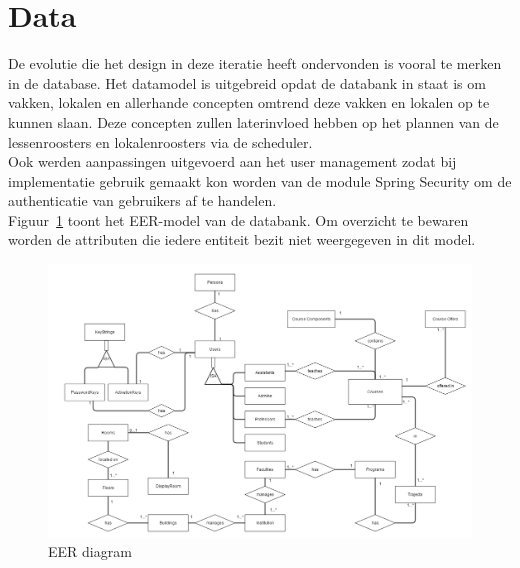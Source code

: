 \section{Data}
\label{sec:data}
De evolutie die het design in deze iteratie heeft ondervonden is vooral te merken in de database.
Het datamodel is uitgebreid opdat de databank in staat is om vakken, lokalen en allerhande concepten omtrend deze vakken en lokalen op te kunnen slaan. Deze concepten zullen laterinvloed hebben op het plannen van de lessenroosters en lokalenroosters via de scheduler.\\

Ook werden aanpassingen uitgevoerd aan het user management zodat bij implementatie gebruik gemaakt kon worden van de module Spring Security\cite{spring-security} om de authenticatie van gebruikers af te handelen.\\

Figuur~\ref{fig:EER diagram} toont het EER-model van de databank. Om overzicht te bewaren worden de attributen die iedere entiteit bezit niet weergegeven in dit model.

\begin{figure}[H]
	\centering
	\includegraphics[scale=0.4]{img/ER2-gliffy}
	\caption{EER diagram}
	\label{fig:EER diagram}
\end{figure}
